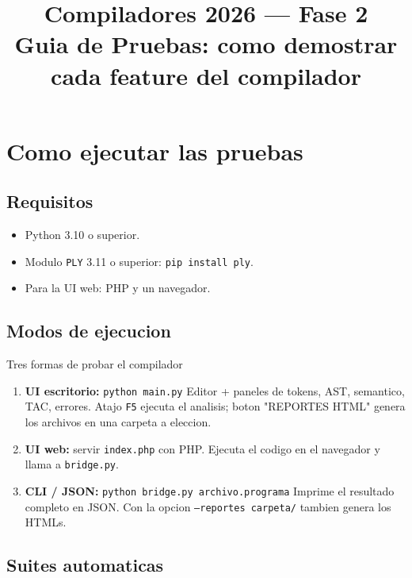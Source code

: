 \documentclass[11pt,a4paper]{article}
\title{\vspace{-1.2cm}\color{azulOscuro}\textbf{Compiladores 2026 --- Fase 2}\\[0.3em]
\large\color{black}Guia de Pruebas: como demostrar cada feature del compilador}
\author{}
\date{}
\begin{document}
\maketitle
\vspace{-1.2cm}

\section{Como ejecutar las pruebas}

\subsection{Requisitos}

\begin{itemize}[leftmargin=*,nosep]
  \item Python 3.10 o superior.
  \item Modulo \texttt{PLY} 3.11 o superior: \texttt{pip install ply}.
  \item Para la UI web: PHP y un navegador.
\end{itemize}

\subsection{Modos de ejecucion}

\begin{caja}{Tres formas de probar el compilador}
\begin{enumerate}[leftmargin=*,nosep]
  \item \textbf{UI escritorio:} \texttt{python main.py}
        Editor + paneles de tokens, AST, semantico, TAC, errores.
        Atajo \texttt{F5} ejecuta el analisis; boton "REPORTES HTML"
        genera los archivos en una carpeta a eleccion.
  \item \textbf{UI web:} servir \texttt{index.php} con PHP. Ejecuta
        el codigo en el navegador y llama a \texttt{bridge.py}.
  \item \textbf{CLI / JSON:} \texttt{python bridge.py archivo.programa}
        Imprime el resultado completo en JSON. Con la opcion
        \texttt{--reportes carpeta/} tambien genera los HTMLs.
\end{enumerate}
\end{caja}

\subsection{Suites automaticas}
\end{document}
